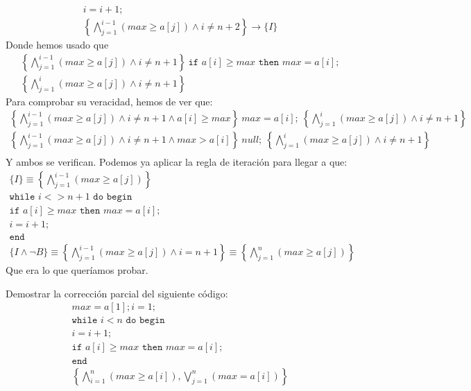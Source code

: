 \begin{ejercicio}
\begin{gather*}
        i = i +1; \\
        \left\{\bigwedge_{j=1}^{i-1} (max \geq a[j]) \land i\neq n+2\right\} \rightarrow \{I\}
    \end{gather*}
    Donde hemos usado que
    \begin{multline*}
        \left\{\bigwedge_{j=1}^{i-1} (max \geq a[j]) \land i\neq n+1\right\}\ \texttt{if\ } a[i] \geq max \texttt{\ then\ } max = a[i];\\ \left\{\bigwedge_{j=1}^{i} (max \geq a[j]) \land i\neq n+1\right\} 
    \end{multline*}
    Para comprobar su veracidad, hemos de ver que:
    \begin{gather*}
    \left\{\bigwedge_{j=1}^{i-1} (max \geq a[j]) \land i\neq n+1 \land a[i] \geq max\right\}\ max = a[i];\ \left\{\bigwedge_{j=1}^{i} (max \geq a[j]) \land i\neq n+1\right\} \\
    \left\{\bigwedge_{j=1}^{i-1} (max \geq a[j]) \land i\neq n+1 \land max > a[i]\right\}\ null;\ \left\{\bigwedge_{j=1}^{i} (max \geq a[j]) \land i\neq n+1\right\} \\
    \end{gather*}
    Y ambos se verifican. Podemos ya aplicar la regla de iteración para llegar a que:
    \begin{gather*}
        \{I\} \equiv \left\{\bigwedge_{j=1}^{i-1} (max \geq a[j])\right\} \\
        \texttt{while\ } i <> n+1 \texttt{\ do\ begin} \\
        \texttt{if\ } a[i] \geq max \texttt{\ then\ } max = a[i];\\
        i=i+1; \\
        \texttt{end} \\
        \{I \land \lnot B\} \equiv \left\{\bigwedge_{j=1}^{i-1} (max \geq a[j]) \land i=n+1\right\} \equiv \left\{\bigwedge_{j=1}^{n} (max \geq a[j])\right\}
    \end{gather*}
    Que era lo que queríamos probar.
\end{ejercicio}

\begin{ejercicio}
    Demostrar la corrección parcial del siguiente código:
    \begin{gather*}
        max = a[1]; i = 1; \\
        \texttt{while\ } i < n \texttt{\ do\ begin} \\
        i = i +1; \\
        \texttt{if\ } a[i] \geq max \texttt{\ then\ } max = a[i]; \\
        \texttt{end} \\
        \left\{\bigwedge_{i=1}^n (max \geq a[i]), \bigvee_{j=1}^n (max = a[i]) \right\}
    \end{gather*}
\end{ejercicio}

